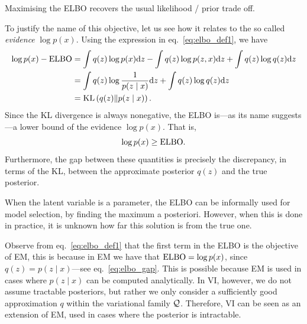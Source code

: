 \begin{remark}
    Maximising the ELBO recovers the usual likelihood / prior trade off. 
\end{remark}

To justify the name of this objective, let us see how it relates to the so called \emph{evidence} $\log p(x)$. Using the expression in eq.~\eqref{eq:elbo_def1}, we have
\begin{align}
    \log p(x) - {\text{ELBO}}
    &= 
    \int q(z) \log p(x) {\text{d}z} - \int q(z)\log p(z,x) {\text{d}z}  + \int q(z)\log q(z) {\text{d}z}\nonumber\\
    &= 
    \int q(z) \log \frac{1}{p(z \mid x)} {\text{d}z}  + \int q(z)\log q(z) {\text{d}z}\nonumber\\
    &= \text{KL}\left(q(z)\middle\|p(z \mid x)\right). \label{eq:elbo_gap}
\end{align}
Since the KL divergence is always nonegative, the ELBO is---as its name suggests---a lower bound of the evidence $\log p(x)$. That is, 
\[
\log p(x) \geq {\text{ELBO}}.
\]
Furthermore, the gap between these quantities is precisely the discrepancy, in terms of the KL, between the approximate posterior $q(z)$ and the true posterior. 

\begin{remark}
    When the latent variable is a parameter, the ELBO can be informally used for model selection, by finding the maximum a posteriori. However, when this is done in practice, it is unknown how far this solution is from the true one. 
\end{remark}

\begin{remark}
    Observe from eq.~\eqref{eq:elbo_def1} that the first term in the ELBO is the objective of EM, this is because in EM we have that ${\text{ELBO}} = \log p(x)$, since $q(z) = p(z \mid x)$---see eq.~\eqref{eq:elbo_gap}. This is possible because EM is used in cases where $p(z \mid x)$ can be computed analytically. In VI, however, we do not assume tractable posteriors, but rather we only consider a sufficiently good approximation $q$ within the variational family ${\mathcal Q}$. Therefore, VI can be seen as an extension of EM, used in cases where the posterior is intractable. 
\end{remark}

